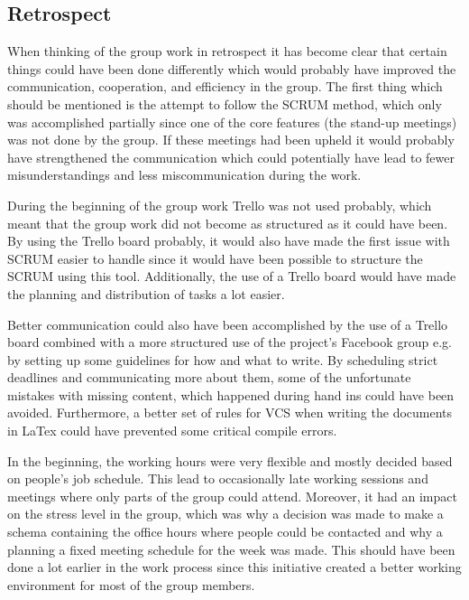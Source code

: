 \subsection{Retrospect}
When thinking of the group work in retrospect it has become clear that certain things could have been done differently which would probably have improved the communication, cooperation, and efficiency in the group.
The first thing which should be mentioned is the attempt to follow the SCRUM method, which only was accomplished partially since one of the core features (the stand-up meetings) was not done by the group. If these meetings had been upheld it would probably have strengthened the communication which could potentially have lead to fewer misunderstandings and less miscommunication during the work.

During the beginning of the group work Trello was not used probably, which meant that the group work did not become as structured as it could have been. By using the Trello board probably, it would also have made the first issue with SCRUM easier to handle since it would have been possible to structure the SCRUM using this tool. Additionally, the use of a Trello board would have made the planning and distribution of tasks a lot easier.

Better communication could also have been accomplished by the use of a Trello board combined with a more structured use of the project's  Facebook group e.g. by setting up some guidelines for how and what to write. By scheduling strict deadlines and communicating more about them, some of the unfortunate mistakes with missing content, which happened during hand ins could have been avoided. Furthermore, a better set of rules for VCS when writing the documents in LaTex could have prevented some critical compile errors.

In the beginning, the working hours were very flexible and mostly decided based on people's job schedule. This lead to occasionally  late working sessions and meetings where only parts of the group could attend. Moreover, it had an impact on the stress level in the group, which was why a decision was made to make a schema containing the office hours where people could be contacted and why a planning a fixed meeting schedule for the week was made. This should have been done a lot earlier in the work process since this initiative created a better working environment for most of the group members.

